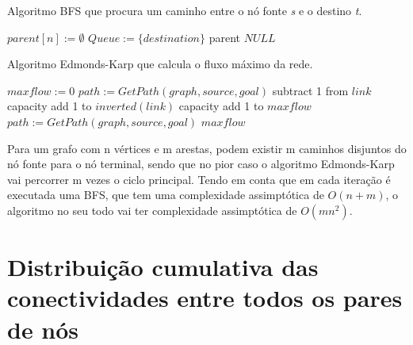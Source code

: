 \documentclass[12pt,a4paper]{article}
\begin{document}
\begin{algorithm}
\caption{Algoritmo BFS que procura um caminho entre o nó fonte \textit{s} e o destino \textit{t}.}\label{alg:bfs_goal}
\begin{algorithmic}[1]
    	\State $parent[n] := \emptyset $
    \EndFor
    \State $Queue :=  \{destination\}$
      		\Return parent 
      \EndIf
            \EndIf
      \EndFor
  	\EndWhile
  	\Return $NULL$
\EndProcedure
\end{algorithmic}
\end{algorithm}

\begin{algorithm}
\caption{Algoritmo Edmonds-Karp que calcula o fluxo máximo da rede.}\label{alg:residual_network}
\begin{algorithmic}[1]
    \State $maxflow := 0 $
    \State $path := GetPath(graph,source,goal)$
      		\State subtract 1 from $link$ capacity
        	\State add 1 to $inverted(link)$ capacity
      \EndFor
      \State add 1 to $maxflow$
      \State $path := GetPath(graph,source,goal)$
  	\EndWhile
  	\Return $maxflow$
\EndProcedure
\end{algorithmic}
\end{algorithm}

Para um grafo com n vértices e m arestas, podem existir m caminhos disjuntos do nó fonte para o nó terminal, sendo que no pior caso o algoritmo Edmonds-Karp vai percorrer m vezes o ciclo principal.
Tendo em conta que em cada iteração é executada uma BFS, que tem uma complexidade assimptótica de $O(n+m)$, o algoritmo no seu todo vai ter complexidade assimptótica de $O(m n^2)$.

\section{Distribuição cumulativa das conectividades entre todos os pares de nós}
\end{document}
